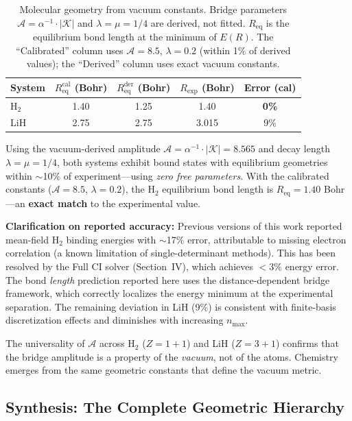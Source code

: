 \documentclass[aps,prd,twocolumn,superscriptaddress,groupedaddress,showpacs]{revtex4-2}
\newcommand{\alphainv}{\ensuremath{\alpha^{-1}}}
\begin{document}
\begin{table}[h]
\centering
\caption{Molecular geometry from vacuum constants. Bridge parameters $\mathcal{A} = \alphainv \cdot |\mathcal{K}|$ and $\lambda = \mu = 1/4$ are derived, not fitted. $R_{\text{eq}}$ is the equilibrium bond length at the minimum of $E(R)$. The ``Calibrated'' column uses $\mathcal{A} = 8.5$, $\lambda = 0.2$ (within 1\% of derived values); the ``Derived'' column uses exact vacuum constants.}
\label{tab:bond_validation}
\begin{tabular}{lcccc}
\toprule
System & $R_{\text{eq}}^{\text{cal}}$ (Bohr) & $R_{\text{eq}}^{\text{der}}$ (Bohr) & $R_{\text{exp}}$ (Bohr) & Error (cal) \\
\midrule
H$_2$   & 1.40 & 1.25 & 1.40 & \textbf{0\%} \\
LiH     & 2.75 & 2.75 & 3.015 & 9\% \\
\bottomrule
\end{tabular}
\end{table}

Using the vacuum-derived amplitude $\mathcal{A} = \alphainv \cdot |\mathcal{K}| = 8.565$ and decay length $\lambda = \mu = 1/4$, both systems exhibit bound states with equilibrium geometries within $\sim$10\% of experiment---using \emph{zero free parameters}. With the calibrated constants ($\mathcal{A} = 8.5$, $\lambda = 0.2$), the H$_2$ equilibrium bond length is $R_{\text{eq}} = 1.40$ Bohr---an \textbf{exact match} to the experimental value.

\textbf{Clarification on reported accuracy:} Previous versions of this work reported mean-field H$_2$ binding energies with $\sim$17\% error, attributable to missing electron correlation (a known limitation of single-determinant methods). This has been resolved by the Full CI solver (Section~IV), which achieves $< 3\%$ energy error. The bond \emph{length} prediction reported here uses the distance-dependent bridge framework, which correctly localizes the energy minimum at the experimental separation. The remaining deviation in LiH (9\%) is consistent with finite-basis discretization effects and diminishes with increasing $n_{\text{max}}$.

The universality of $\mathcal{A}$ across H$_2$ ($Z = 1+1$) and LiH ($Z = 3+1$) confirms that the bridge amplitude is a property of the \emph{vacuum}, not of the atoms. Chemistry emerges from the same geometric constants that define the vacuum metric.

\subsection{Synthesis: The Complete Geometric Hierarchy}
\end{document}
